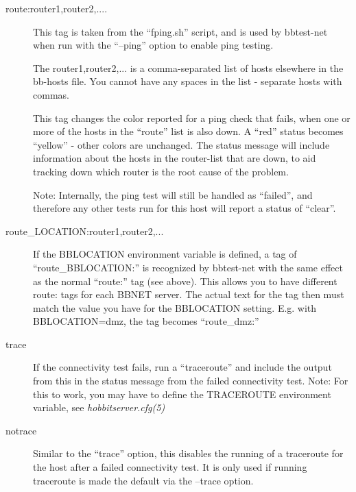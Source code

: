 \begin{description}
 

\item[route:router1,router2,....] This tag is taken from the ``fping.sh'' script, and is used by bbtest-net when run with the ``--ping'' option to enable ping testing. 

  The router1,router2,... is a comma-separated list of hosts elsewhere in the bb-hosts file. You cannot have any spaces in the list - separate hosts with commas. 


  This tag changes the color reported for a ping check that fails,
  when one or more of the hosts in the ``route'' list is also down. A
  ``red'' status becomes ``yellow'' - other colors are unchanged. The
  status message will include information about the hosts in the
  router-list that are down, to aid tracking down which router is the
  root cause of the problem. 



  Note: Internally, the ping test will still be handled as ``failed'',
  and therefore any other tests run for this host will report a status
  of ``clear''. 



 

\item[route\_LOCATION:router1,router2,...] If the BBLOCATION
  environment variable is defined, a tag of ``route\_BBLOCATION:'' is
  recognized by bbtest-net with the same effect as the normal
  ``route:'' tag (see above). This allows you to have different route:
  tags for each BBNET server. The actual text for the tag then must
  match the value you have for the BBLOCATION setting. E.g. with
  BBLOCATION=dmz, the tag becomes ``route\_dmz:'' 


 

\item[trace] If the connectivity test fails, run a ``traceroute'' and
  include the output from this in the status message from the failed
  connectivity test. Note: For this to work, you may have to define
  the TRACEROUTE environment variable, see \emph{hobbitserver.cfg(5)}



 

\item[notrace] Similar to the ``trace'' option, this disables the
  running of a traceroute for the host after a failed connectivity
  test. It is only used if running traceroute is made the default via
  the --trace option. 


 


\end{description}

